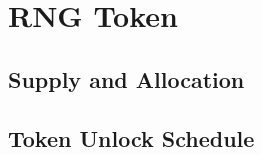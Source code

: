 \section{RNG Token}\label{sec:rng_token}

\subsection{Supply and Allocation}\label{sec:token_supply}

\subsection{Token Unlock Schedule}\label{sec:token_unlock}
